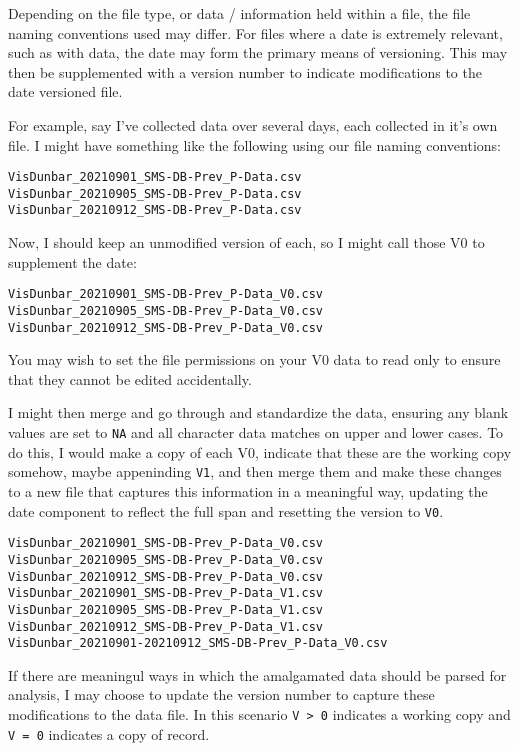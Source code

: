 \documentclass[
]{book}
\begin{document}
Depending on the file type, or data / information held within a file, the file naming conventions used may differ. For files where a date is extremely relevant, such as with data, the date may form the primary means of versioning. This may then be supplemented with a version number to indicate modifications to the date versioned file.

For example, say I've collected data over several days, each collected in it's own file. I might have something like the following using our file naming conventions:

\begin{verbatim}
VisDunbar_20210901_SMS-DB-Prev_P-Data.csv
VisDunbar_20210905_SMS-DB-Prev_P-Data.csv
VisDunbar_20210912_SMS-DB-Prev_P-Data.csv
\end{verbatim}

Now, I should keep an unmodified version of each, so I might call those V0 to supplement the date:

\begin{verbatim}
VisDunbar_20210901_SMS-DB-Prev_P-Data_V0.csv
VisDunbar_20210905_SMS-DB-Prev_P-Data_V0.csv
VisDunbar_20210912_SMS-DB-Prev_P-Data_V0.csv
\end{verbatim}

You may wish to set the file permissions on your V0 data to read only to ensure that they cannot be edited accidentally.

I might then merge and go through and standardize the data, ensuring any blank values are set to \texttt{NA} and all character data matches on upper and lower cases. To do this, I would make a copy of each V0, indicate that these are the working copy somehow, maybe appeninding \texttt{V1}, and then merge them and make these changes to a new file that captures this information in a meaningful way, updating the date component to reflect the full span and resetting the version to \texttt{V0}.

\begin{verbatim}
VisDunbar_20210901_SMS-DB-Prev_P-Data_V0.csv
VisDunbar_20210905_SMS-DB-Prev_P-Data_V0.csv
VisDunbar_20210912_SMS-DB-Prev_P-Data_V0.csv
VisDunbar_20210901_SMS-DB-Prev_P-Data_V1.csv
VisDunbar_20210905_SMS-DB-Prev_P-Data_V1.csv
VisDunbar_20210912_SMS-DB-Prev_P-Data_V1.csv
VisDunbar_20210901-20210912_SMS-DB-Prev_P-Data_V0.csv
\end{verbatim}

If there are meaningul ways in which the amalgamated data should be parsed for analysis, I may choose to update the version number to capture these modifications to the data file. In this scenario \texttt{V\ \textgreater{}\ 0} indicates a working copy and \texttt{V\ =\ 0} indicates a copy of record.
\end{document}
